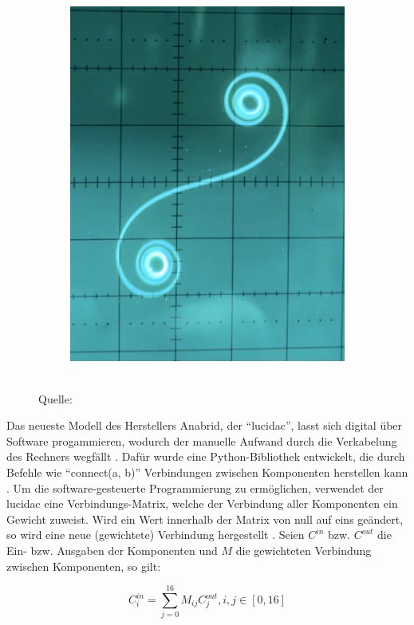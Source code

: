 \begin{figure}[h]
\begin{subfigure}{.2\textwidth}
    \includegraphics[width=\textwidth]{abbildungen/euler_spirale_ausgabe.jpg}\par
  \end{subfigure}
  \\
  Quelle: \cite{TheAnalogThingDocs}
\end{figure}

Das neueste Modell des Herstellers Anabrid, der "`lucidac"', lasst sich digital über Software progammieren, wodurch der manuelle Aufwand durch die Verkabelung des Rechners wegfällt \cite[vgl.]{AnabridLucidAC2025}. Dafür wurde eine Python-Bibliothek entwickelt, die durch Befehle wie "`connect(a, b)"' Verbindungen zwischen Komponenten herstellen kann \cite[vgl.]{AnabridLucipy}. Um die software-gesteuerte Programmierung zu ermöglichen, verwendet der lucidac eine Verbindungs-Matrix, welche der Verbindung aller Komponenten ein Gewicht zuweist. Wird ein Wert innerhalb der Matrix von null auf \zb eins geändert, so wird eine neue (gewichtete) Verbindung hergestellt \cite{AnabridLucidAC2025}. Seien \(C^{in}\) bzw. \(C^{out}\) die Ein- bzw. Ausgaben der Komponenten und \(M\) die gewichteten Verbindung zwischen Komponenten, so gilt:

\[C_i^{in}=\sum_{j=0}^{16}M_{ij}C_j^{out}, i,j\in[0,16]\]
